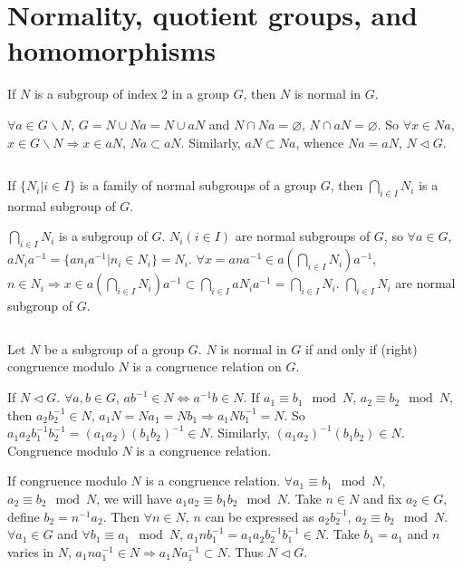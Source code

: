 \section{Normality, quotient groups, and homomorphisms}
\begin{ex}
    If $N$ is a subgroup of index 2 in a group $G$, then $N$ is normal in $G$.
\end{ex}

\begin{answer}
    $\forall a\in G\backslash N$, $G=N\cup Na=N\cup aN$ and $N\cap Na=\varnothing$, $N\cap aN=\varnothing$. So $\forall x\in Na$, $x\in G\backslash N\Rightarrow x\in aN$, $Na\subset aN$. Similarly, $aN\subset Na$, whence $Na=aN$, $N\lhd G$.
\end{answer}

$$ $$

\begin{ex}
    If $\{N_{i}|i\in I\}$ is a family of normal subgroups of a group $G$, then $\bigcap\limits_{i\in I}N_{i}$ is a normal subgroup of $G$.
\end{ex}

\begin{answer}
    $\bigcap\limits_{i\in I}N_{i}$ is a subgroup of $G$. $N_{i} (i\in I)$ are normal subgroups of $G$, so $\forall a\in G$, $aN_{i}a^{-1}=\{an_{i}a^{-1}|n_{i}\in N_{i}\}=N_{i}$. $\forall x=ana^{-1}\in a(\bigcap\limits_{i\in I}N_{i})a^{-1}$, $n\in N_{i}\Rightarrow x\in a(\bigcap\limits_{i\in I}N_{i})a^{-1}\subset \bigcap\limits_{i\in I}aN_{i}a^{-1}=\bigcap\limits_{i\in I}N_{i}$. $\bigcap\limits_{i\in I}N_{i}$ are normal subgroup of $G$.
\end{answer}

$$ $$

\begin{ex}
    Let $N$ be a subgroup of a group $G$. $N$ is normal in $G$ if and only if (right) congruence modulo $N$ is a congruence relation on $G$.
\end{ex}

\begin{answer}
    If $N\lhd G$. $\forall a,b\in G$, $ab^{-1}\in N\Leftrightarrow a^{-1}b\in N$. If $a_{1}\equiv b_{1}\mod N$, $a_{2}\equiv b_{2}\mod N$, then $a_{2}b_{2}^{-1}\in N$, $a_{1}N=Na_{1}=Nb_{1}\Rightarrow a_{1}Nb_{1}^{-1}=N$. So $a_{1}a_{2}b_{1}^{-1}b_{2}^{-1}=(a_{1}a_{2})(b_{1}b_{2})^{-1}\in N$. Similarly, $(a_{1}a_{2})^{-1}(b_{1}b_{2})\in N$. Congruence modulo $N$ is a congruence relation.

    If congruence modulo $N$ is a congruence relation. $\forall a_{1}\equiv b_{1}\mod N$, $a_{2}\equiv b_{2}\mod N$, we will have $a_{1}a_{2}\equiv b_{1}b_{2}\mod N$. Take $n\in N$ and fix $a_{2}\in G$, define $b_{2}=n^{-1}a_{2}$. Then $\forall n\in N$, $n$ can be expressed as $a_{2}b_{2}^{-1}$, $a_{2}\equiv b_{2}\mod N$. $\forall a_{1}\in G$ and $\forall b_{1}\equiv a_{1}\mod N$, $a_{1}nb_{1}^{-1}=a_{1}a_{2}b_{2}^{-1}b_{1}^{-1}\in N$. Take $b_{1}=a_{1}$ and $n$ varies in $N$, $a_{1}na_{1}^{-1}\in N\Rightarrow a_{1}Na_{1}^{-1}\subset N$. Thus $N\lhd G$.
\end{answer}

